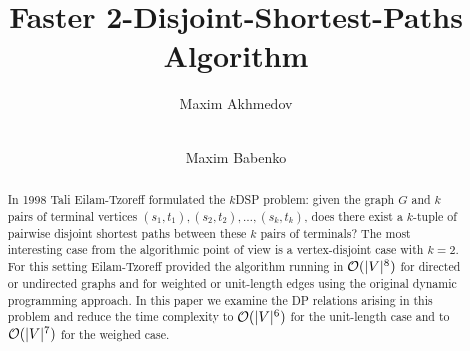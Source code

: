 \title{Faster 2-Disjoint-Shortest-Paths Algorithm}

\author{Maxim Akhmedov \and \\
Maxim Babenko}


\maketitle

\begin{abstract}
In 1998 Tali Eilam-Tzoreff formulated the $k$DSP problem: given the graph $G$ and $k$ pairs of terminal vertices $(s_1, t_1), (s_2, t_2), \ldots, (s_k, t_k)$, does there exist a $k$-tuple of pairwise disjoint shortest paths between these $k$ pairs of terminals? The most interesting case from the algorithmic point of view is a vertex-disjoint case with $k=2$. For this setting Eilam-Tzoreff provided the algorithm running in $\mathcal{O}(|V|^8)$ for directed or undirected graphs and for weighted or unit-length edges using the original dynamic programming approach. In this paper we examine the DP relations arising in this problem and reduce the time complexity to $\mathcal{O}(|V|^6)$ for the unit-length case and to $\mathcal{O}(|V|^7)$ for the weighed case.

\end{abstract}

